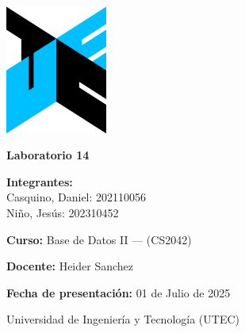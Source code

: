 \begin{titlepage}
    \pagestyle{empty}
    \begin{center}
        \includegraphics[width=0.25\textwidth]{isologo-utec.png} %
        \vspace{1cm}

        {\LARGE\textbf{Laboratorio 14}}
        \vspace{1.5cm}

        {\large
            \textbf{Integrantes:} \\
            Casquino, Daniel: 202110056 \\
            Niño, Jesús: 202310452 \\
        }
        \vspace{1cm}

        {\large
            \textbf{Curso:} Base de Datos II --- (CS2042)
        }
        \vspace{0.5cm}

        {\large
            \textbf{Docente:} Heider Sanchez
        }
        \vspace{0.5cm}

        {\large
            \textbf{Fecha de presentación:} 01 de Julio de 2025
        }
        \vfill

        {\large
            Universidad de Ingeniería y Tecnología (UTEC)
        }
    \end{center}
\end{titlepage}